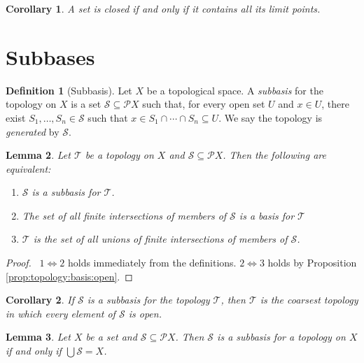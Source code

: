 \documentclass{report}
\let\qed\relax
\newtheorem{lm}{Lemma}[section]
\newtheorem{cor}{Corollary}[lm]
\theoremstyle{definition}
\newtheorem{df}[lm]{Definition}
\begin{document}
  \begin{cor}
    \label{cor:topology:limit_point:closed}
    A set is closed if and only if it contains all its limit points.
  \end{cor}

  \section{Subbases}

  \begin{df}[Subbasis]
    Let $X$ be a topological space. A \emph{subbasis} for the topology on $X$
    is
    a set $\mathcal{S} \subseteq \mathcal{P} X$ such that, for every open set
    $U$
    and $x \in U$, there exist $S_1, \ldots, S_n \in \mathcal{S}$ such that $x
    \in S_1 \cap \cdots \cap S_n \subseteq U$. We say the topology is
    \emph{generated} by $\mathcal{S}$.
  \end{df}

  \begin{lm}
    \label{lm:topology:subbasis:generate}
    Let $\mathcal{T}$ be a topology on $X$ and $\mathcal{S}
    \subseteq \mathcal{P} X$.   Then the following are equivalent:
    \begin{enumerate}
      \item $\mathcal{S}$ is a subbasis for $\mathcal{T}$.
      \item The set of all finite intersections of members of $\mathcal{S}$ is
      a
      basis for $\mathcal{T}$
      \item $\mathcal{T}$ is the set of all unions of finite intersections of
      members of $\mathcal{S}$.
    \end{enumerate}
  \end{lm}

  \begin{proof}
    \pf\ $1 \Leftrightarrow 2$ holds immediately from the definitions. $2
    \Leftrightarrow 3$ holds by Proposition \ref{prop:topology:basis:open}. \qed
  \end{proof}

  \begin{cor}
    \label{cor:topology:subbasis:coarsest}
    If $\mathcal{S}$ is a subbasis for the topology $\mathcal{T}$, then
    $\mathcal{T}$ is the coarsest topology in which every element of
    $\mathcal{S}$ is open.
  \end{cor}

  \begin{lm}
    Let $X$ be a set and $\mathcal{S} \subseteq \mathcal{P} X$. Then
    $\mathcal{S}$ is a subbasis for a topology on $X$ if and only if $\bigcup
    \mathcal{S} = X$.
  \end{lm}
\end{document}
